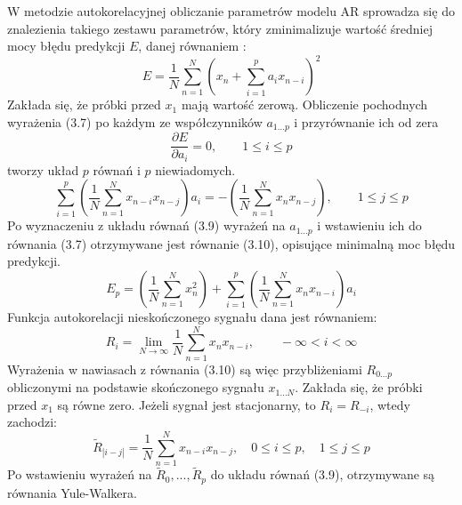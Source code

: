\documentclass[notitlepage]{report}
\begin{document}
W metodzie autokorelacyjnej obliczanie parametrów modelu AR sprowadza się do znalezienia takiego zestawu parametrów, który zminimalizuje wartość średniej mocy błędu predykcji $E$, danej równaniem \cite{pardey}:
\begin{equation}
E = \frac{1}{N}\sum_{n=1}^{N}\left(x_n + \sum_{i=1}^{p}a_ix_{n-i}\right)^2
\end{equation}
Zakłada się, że próbki przed $x_1$ mają wartość zerową. Obliczenie pochodnych wyrażenia (3.7) po każdym ze współczynników $a_{1...p}$ i przyrównanie ich od zera
\begin{equation}
\frac{\partial E}{\partial a_i} = 0, \qquad 1 \le i \le p
\end{equation}
tworzy układ $p$ równań i $p$ niewiadomych.
\begin{equation}
\sum_{i=1}^{p}\left(\frac{1}{N}\sum_{n=1}^{N}x_{n-i}x_{n-j}\right)a_i = -\left(\frac{1}{N}\sum_{n=1}^{N}x_nx_{n-j} \right),\qquad 1 \le j \le p
\end{equation}
Po wyznaczeniu z układu równań (3.9) wyrażeń na $a_{1...p}$ i wstawieniu ich do równania (3.7) otrzymywane jest równanie (3.10), opisujące minimalną moc błędu predykcji.
\begin{equation}
E_p = \left(\frac{1}{N}\sum_{n=1}^{N}x_{n}^{2}\right) + \sum_{i=1}^{p}\left( \frac{1}{N}\sum_{n=1}^{N}x_nx_{n-i}\right)a_i
\end{equation}
Funkcja autokorelacji nieskończonego sygnału dana jest równaniem:
\begin{equation}
R_i = \lim\limits_{N \rightarrow \infty} \frac{1}{N}\sum_{n=1}^{N}x_nx_{n-i}, \qquad -\infty<i<\infty
\end{equation}
Wyrażenia w nawiasach z równania (3.10) są więc przybliżeniami $R_{0...p}$ obliczonymi na podstawie skończonego sygnału $x_{1...N}$. Zakłada się, że próbki przed $x_1$ są równe zero. Jeżeli sygnał jest stacjonarny, to $R_i = R_{-i}$, wtedy zachodzi:
\begin{equation}
\tilde{R}_{|i-j|} = \frac{1}{N}\sum_{n=1}^{N}x_{n-i}x_{n-j}, \quad 0 \le i \le p, \quad 1 \le j \le p
\end{equation}
Po wstawieniu wyrażeń na $\tilde{R}_0,...,\tilde{R}_p$ do układu równań (3.9), otrzymywane są równania Yule-Walkera.
\end{document}
